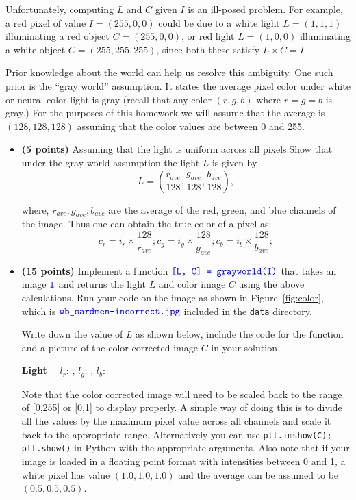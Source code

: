 \documentclass[10pt,letterpaper]{article}
\newcommand{\cmd}[1] {{\color{blue}\texttt{#1}}}
\begin{document}
Unfortunately, computing $L$ and $C$ given $I$ is an ill-posed
problem.
For example, a red pixel of value $I=(255,0,0)$ could be due to a white light
$L=(1,1,1)$ illuminating a red object $C=(255,0,0)$, or red light
$L=(1,0,0)$ illuminating a white object $C=(255,255,255)$, since both these
satisfy $L\times C = I$.

Prior knowledge about the world can help us resolve this ambiguity.
One such prior is the ``gray world'' assumption.
It states the average pixel color under white or neural color light is
gray (recall that any color $(r,g,b)$ where $r=g=b$ is gray.)
For the purposes of this homework we will assume that the average is
$(128,128,128)$ assuming that the color values are between 0 and 255.


\begin{itemize}
\item \textbf{(5 points)} Assuming that the light is uniform across
  all pixels.Show that under the gray world assumption the light $L$ is given by
\[
	L = \left(\frac{r_{ave}}{128}, \frac{g_{ave}}{128}, \frac{b_{ave}}{128}\right),
\]

where, $r_{ave}, g_{ave}, b_{ave}$ are the average of the red, green,
and blue channels of the image.
Thus one can obtain the true color of a pixel as:
\[
	c_r = i_r \times \frac{128}{r_{ave}}; 
	c_g = i_g \times \frac{128}{g_{ave}}; 
	c_b = i_b \times \frac{128}{b_{ave}}; 
\]

\item \textbf{(15 points)} Implement a function $\cmd{[L, C] =
  grayworld(I)}$ that takes an image $\cmd{I}$ and returns the light
  $L$ and color image $C$ using the above calculations. Run your code
  on the image as shown in Figure~\ref{fig:color}, which is $\cmd{wb\_sardmen-incorrect.jpg}$ included in the \cmd{data} directory.
  
Write down the value of $L$ as shown below, include the code for the function and a picture of the
color corrected image $C$ in your solution.

\textbf{Light}~~ $l_r$: \underline{\hspace{2cm}}, $l_g$: \underline{\hspace{3cm}}, $l_b$:\underline{\hspace{3cm}}


Note that the color corrected image will need to be scaled back to the
range of [0,255] or [0,1] to display properly. A simple way of doing
this is to divide all the values by the maximum pixel value across all
channels and scale it back to the appropriate range.
Alternatively you can use \cmd{plt.imshow(C); plt.show()} in Python
with the appropriate arguments.
Also note that if your image is loaded in a floating point format with
intensities between 0 and 1, a white pixel has value $(1.0, 1.0, 1.0)$
and the average can be assumed to be $(0.5, 0.5, 0.5)$.

\end{itemize}
\end{document}

